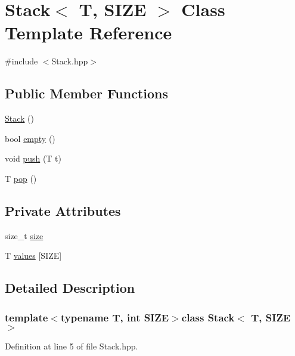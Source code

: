 \hypertarget{classStack}{\section{Stack$<$ T, S\-I\-Z\-E $>$ Class Template Reference}
\label{classStack}
}


{\ttfamily \#include $<$Stack.\-hpp$>$}

\subsection*{Public Member Functions}
\begin{DoxyCompactItemize}
\item 
\hyperlink{classStack_ab1fc0ee4439d367bb92facdc37766a7a}{Stack} ()
\item 
bool \hyperlink{classStack_a505bf640900c9ddd08a7666e85c7d53c}{empty} ()
\item 
void \hyperlink{classStack_a57cb3e28d1b7349dfea8e42c95186abc}{push} (T t)
\item 
T \hyperlink{classStack_a0ec82a1e0e291e07f3fd5ef616b09423}{pop} ()
\end{DoxyCompactItemize}
\subsection*{Private Attributes}
\begin{DoxyCompactItemize}
\item 
size\-\_\-t \hyperlink{classStack_a2bf4c06162c7356ca41792de93a68f49}{size}
\item 
T \hyperlink{classStack_ad6737211e34f9e427b9c91f32a16ad18}{values} \mbox{[}S\-I\-Z\-E\mbox{]}
\end{DoxyCompactItemize}


\subsection{Detailed Description}
\subsubsection*{template$<$typename T, int S\-I\-Z\-E$>$class Stack$<$ T, S\-I\-Z\-E $>$}



Definition at line 5 of file Stack.\-hpp.



